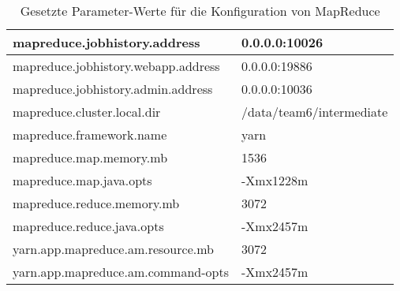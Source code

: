 \begin{appendices}
\begin{table}
	\begin{tabularx}{\textwidth}{| X | X |} \hline
	mapreduce.jobhistory.address & 0.0.0.0:10026 \\ \hline
	mapreduce.jobhistory.webapp.address & 0.0.0.0:19886 \\ \hline
	mapreduce.jobhistory.admin.address & 0.0.0.0:10036 \\ \hline
	mapreduce.cluster.local.dir & /data/team6/intermediate \\ \hline
	mapreduce.framework.name & yarn \\ \hline
	mapreduce.map.memory.mb & 1536 \\ \hline
	mapreduce.map.java.opts & -Xmx1228m \\ \hline
	mapreduce.reduce.memory.mb & 3072 \\ \hline
	mapreduce.reduce.java.opts & -Xmx2457m \\ \hline
	yarn.app.mapreduce.am.resource.mb & 3072 \\ \hline
	yarn.app.mapreduce.am.command-opts & -Xmx2457m \\ \hline
	\end{tabularx}
	\caption{Gesetzte Parameter-Werte für die Konfiguration von MapReduce}
	\label{config:mapreduceValues}
\end{table}


\end{appendices}
